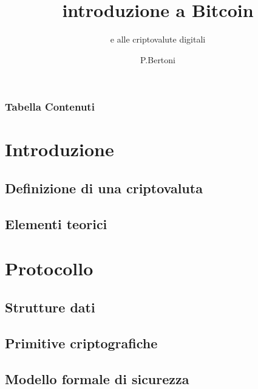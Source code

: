 \documentclass{beamer}
\title{introduzione a Bitcoin}
\subtitle{e alle criptovalute digitali}
\author{P.Bertoni}
\begin{document}
\begin{frame}
	\titlepage
\end{frame}
\begin{frame}
	\frametitle{Tabella Contenuti}
	\tableofcontents
\end{frame}
\section{Introduzione}
\subsection{Definizione di una criptovaluta}
	
	
	
	
	
\subsection{Elementi teorici}
	
	
	
\section{Protocollo}
\subsection{Strutture dati}
	
	
	
	
	
	
\subsection{Primitive criptografiche}
	
	
\subsection{Modello formale di sicurezza}
	
	
	
\end{document}
